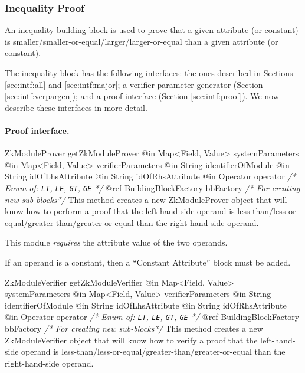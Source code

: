     \subsubsection{Inequality Proof}

    An inequality building block is used to prove that a given attribute (or constant)
    is smaller/smaller-or-equal/larger/larger-or-equal than a given attribute (or constant).

    The inequality block has the following interfaces:
    the ones described in Sections \ref{sec:intf:all} and \ref{sec:intf:major};
    a verifier parameter generator (Section \ref{sec:intf:verpargen});
    and a proof interface (Section \ref{sec:intf:proof}).
      We now describe these interfaces in more detail.

    \paragraph{Proof interface.}
      \begin{method}
      {ZkModuleProver}
      {getZkModuleProver}
      {
        {@in Map<Field, Value> systemParameters}
        {@in Map<Field, Value> verifierParameters}
        {@in String identifierOfModule}
        {@in String idOfLhsAttribute}
        {@in String idOfRhsAttribute}
        {@in Operator operator \textrm{\emph{/* Enum of: \texttt{LT}, \texttt{LE}, \texttt{GT}, \texttt{GE} */}}}
        {@ref BuildingBlockFactory bbFactory \textrm{\emph{/* For creating new sub-blocks*/}}}
      }
      This method creates a new ZkModuleProver object that will know how to
      perform a proof that the left-hand-side operand is less-than/less-or-equal/greater-than/greater-or-equal than the
      right-hand-side operand.

      This module \emph{requires} the attribute value of the two operands.

      If an operand is a constant, then a ``Constant Attribute'' block must be added.
      \end{method}
      \begin{method}
      {ZkModuleVerifier}
      {getZkModuleVerifier}
      {
        {@in Map<Field, Value> systemParameters}
        {@in Map<Field, Value> verifierParameters}
        {@in String identifierOfModule}
        {@in String idOfLhsAttribute}
        {@in String idOfRhsAttribute}
        {@in Operator operator \textrm{\emph{/* Enum of: \texttt{LT}, \texttt{LE}, \texttt{GT}, \texttt{GE} */}}}
        {@ref BuildingBlockFactory bbFactory \textrm{\emph{/* For creating new sub-blocks*/}}}
      }
      This method creates a new ZkModuleVerifier object that will know how to
      verify a proof that the left-hand-side operand is less-than/less-or-equal/greater-than/greater-or-equal than the
      right-hand-side operand.
      \end{method}
